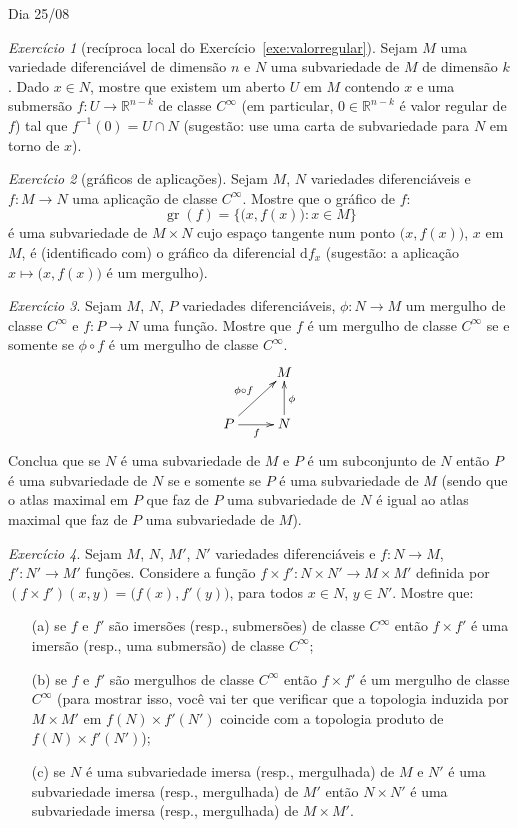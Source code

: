 \documentclass[oneside,11pt]{amsart}
\newcommand{\R}{\mathds R}
\newcommand{\dd}{\mathrm d}
\DeclareMathOperator{\Gr}{gr}
\theoremstyle{remark}\newtheorem{exercise}{Exercício}[section]
\theoremstyle{plain}\newtheorem{teo}{Teorema}[section]
\theoremstyle{plain}\newtheorem{lem}[teo]{Lema}
\theoremstyle{plain}\newtheorem{prop}[teo]{Proposição}
\theoremstyle{definition}\newtheorem{defin}[teo]{Definição}
\theoremstyle{remark}\newtheorem{rem}[teo]{Observação}
\theoremstyle{definition}\newtheorem{example}[teo]{Exemplo}
\numberwithin{equation}{section}
\begin{document}
\begin{section}{Dia 25/08}
\begin{exercise}[recíproca local do Exercício~\ref{exe:valorregular}]
Sejam $M$ uma variedade diferenciável de dimensão $n$ e $N$ uma subvariedade de $M$ de dimensão $k$. Dado
$x\in N$, mostre que existem um aberto $U$ em $M$ contendo $x$ e uma submersão $f:U\to\R^{n-k}$ de classe $C^\infty$
(em particular, $0\in\R^{n-k}$ é valor regular de $f$) tal que $f^{-1}(0)=U\cap N$ (sugestão: use uma carta de subvariedade
para $N$ em torno de $x$).
\end{exercise}

\begin{exercise}[gráficos de aplicações]
Sejam $M$, $N$ variedades diferenciáveis e $f:M\to N$ uma aplicação de classe $C^\infty$. Mostre que o gráfico de
$f$:
\[\Gr(f)=\big\{\big(x,f(x)\big):x\in M\big\}\]
é uma subvariedade de $M\times N$ cujo espaço tangente num ponto $\big(x,f(x)\big)$, $x$ em $M$, é (identificado com)
o gráfico da diferencial $\dd f_x$ (sugestão: a aplicação $x\mapsto\big(x,f(x)\big)$ é um mergulho).
\end{exercise}

\begin{exercise}
Sejam $M$, $N$, $P$ variedades diferenciáveis, $\phi:N\to M$ um mergulho de classe $C^\infty$ e $f:P\to N$ uma função. Mostre que
$f$ é um mergulho de classe $C^\infty$ se e somente se $\phi\circ f$ é um mergulho de classe $C^\infty$.
\[\xymatrix{%
&M\\
P\ar[ur]^{\phi\circ f}\ar[r]_f&N\ar[u]_\phi}\]
Conclua que se $N$ é uma subvariedade
de $M$ e $P$ é um subconjunto de $N$ então $P$ é uma subvariedade de $N$ se e somente se $P$ é uma subvariedade de $M$ (sendo que o atlas maximal em $P$
que faz de $P$ uma subvariedade de $N$ é igual ao atlas maximal que faz de $P$ uma subvariedade de $M$).
\end{exercise}

\begin{exercise}
Sejam $M$, $N$, $M'$, $N'$ variedades diferenciáveis e $f:N\to M$, $f':N'\to M'$ funções. Considere a função $f\times f':N\times N'\to M\times M'$
definida por $(f\times f')(x,y)=\big(f(x),f'(y)\big)$, para todos $x\in N$, $y\in N'$. Mostre que:
\begin{itemize}
\item[(a)] se $f$ e $f'$ são imersões (resp., submersões) de classe $C^\infty$ então $f\times f'$ é uma imersão (resp., uma submersão) de classe $C^\infty$;
\item[(b)] se $f$ e $f'$ são mergulhos de classe $C^\infty$ então $f\times f'$ é um mergulho de classe $C^\infty$ (para mostrar isso, você vai ter que verificar
que a topologia induzida por $M\times M'$ em $f(N)\times f'(N')$ coincide com a topologia produto de $f(N)\times f'(N')$);
\item[(c)] se $N$ é uma subvariedade imersa (resp., mergulhada) de $M$ e $N'$ é uma subvariedade imersa (resp., mergulhada) de $M'$ então
$N\times N'$ é uma subvariedade imersa (resp., mergulhada) de $M\times M'$.
\end{itemize}
\end{exercise}


\end{section}
\end{document}
